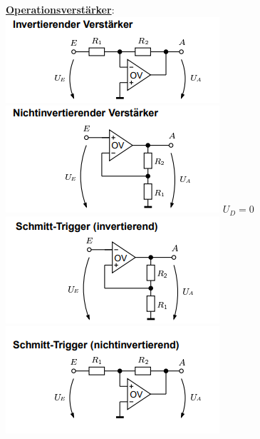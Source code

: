 \documentclass[11pt]{article}
\begin{document}
\begin{minipage}{0.3\textwidth}
\underline{\textbf{Operationsverstärker}}:\\
\includegraphics[scale=0.40]{IOV.png}
\includegraphics[scale=0.40]{NIOV.png}
$U_D = 0$
\includegraphics[scale=0.40]{ISTOV.png}
\includegraphics[scale=0.40]{NISTOV.png}
\end{minipage}%

\end{document}
